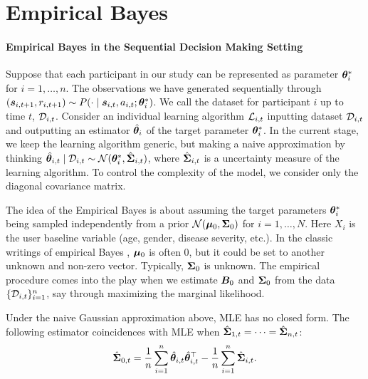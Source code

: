 \documentclass{article}
\newcommand{\sam}[1]{
  {\color{blue} [SAM: {#1}]}
 }
\begin{document}


\section{Empirical Bayes}

\paragraph{Empirical Bayes in the Sequential Decision Making Setting}

Suppose that each participant in our study can be represented as parameter ${\bm{\theta}}^*_{i}$ for $i = 1, \dots, n$. The observations we have generated sequentially through $({\bm{s}}_{i, t+1}, r_{i, t+1}) \sim P(\cdot \mid {\bm{s}}_{i, t}, a_{i, t} ; {\bm{\theta}}^*_i)$. We call the dataset for participant $i$ up to time $t$, ${\mathcal{D}}_{i, t}$. Consider an individual learning algorithm ${\mathcal{L}}_{i, t}$ inputting dataset ${\mathcal{D}}_{i, t}$ and outputting an estimator $\hat {{\bm{\theta}}}_i$ of the target parameter ${\bm{\theta}}_i^*$. In the current stage, we keep the learning algorithm generic, but making a naive approximation by thinking $\hat {{\bm{\theta}}}_{i, t} \mid {\mathcal{D}}_{i, t} \sim {\mathcal{N}}({\bm{\theta}}^*_i, \hat {{\bm{\Sigma}}}_{i, t})$, where $\hat {{\bm{\Sigma}}}_{i, t}$ is a uncertainty measure of the learning algorithm. To control the complexity of the model, we consider only the diagonal covariance matrix.


The idea of the Empirical Bayes is about assuming the target parameters ${\bm{\theta}}_{i}^*$ being sampled independently from a prior ${\mathcal{N}}({\bm{\mu}}_0, {\bm{\Sigma}}_0)$ for $i = 1, \dots, N$. Here $X_{i}$ is the user baseline variable (age, gender, disease severity, etc.). 
In the classic writings of empirical Bayes \citep{efron1973stein}, ${\bm{\mu}}_0$ is often 0, but it could be set to another unknown and non-zero vector. 
Typically, ${\bm{\Sigma}}_0$ is unknown. The empirical procedure comes into the play when we estimate ${\bm{B}}_0$ and ${\bm{\Sigma}}_0$ from the data $\{{\mathcal{D}}_{i, t}\}_{i = 1}^n$, say through maximizing the marginal likelihood. 

Under the naive Gaussian approximation above, MLE has no closed form. The following estimator coincidences with MLE when $\hat {{\bm{\Sigma}}}_{1, t} = \dots = \hat {{\bm{\Sigma}}}_{n, t}$:
\[
    \hat {{\bm{\Sigma}}}_{0, t} = \frac{1}{n} \sum_{i=1}^n \hat {{\bm{\theta}}}_{i, t} \hat {{\bm{\theta}}}_{i, t}^{\top} - \frac{1}{n} \sum_{i=1}^n \hat {{\bm{\Sigma}}}_{i, t}.
\]
\end{document}
